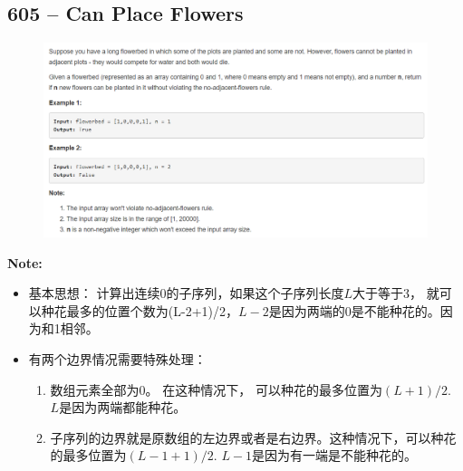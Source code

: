 \documentclass[a4paper,12pt]{article}
\begin{document}
\subsection{605 -- Can Place Flowers}
\begin{figure}[H]
	\begin{center}
		\includegraphics[width=15cm]{605.png}
	\end{center}
\end{figure}
\textbf{\large{Note:}}
\par
\vspace{0.5em}
\noindent
\begin{CJK*}{UTF8}{gbsn}
	\begin{itemize}
		\item 基本思想： 计算出连续0的子序列，如果这个子序列长度$L$大于等于3， 就可以种花最多的位置个数为(L-2+1)/2，$L-2$是因为两端的0是不能种花的。因为和1相邻。
		\item 有两个边界情况需要特殊处理：
		\begin{enumerate}
			\item 数组元素全部为0。 在这种情况下， 可以种花的最多位置为$(L+1)/2$. $L$是因为两端都能种花。
			\item 子序列的边界就是原数组的左边界或者是右边界。这种情况下，可以种花的最多位置为$(L-1+1)/2$. $L-1$是因为有一端是不能种花的。
		\end{enumerate} 
	\end{itemize}
\clearpage
\end{CJK*}
\end{document}
